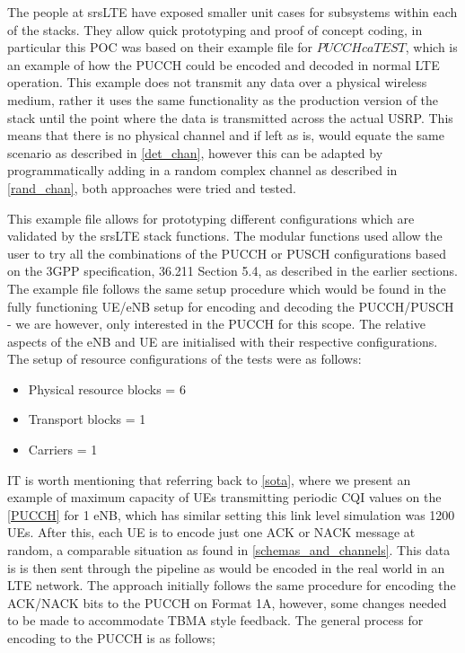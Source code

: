 \documentclass{article}
\begin{document}
The people at srsLTE have exposed smaller unit cases for subsystems within each of the stacks. They allow quick prototyping and proof of concept coding, in particular this POC was based on their example file for $PUCCH ca TEST$, which is an example of how the PUCCH could be encoded and decoded in normal LTE operation. This example does not transmit any data over a physical wireless medium, rather it uses the same functionality as the production version of the stack until the point where the data is transmitted across the actual USRP. This means that there is no physical channel and if left as is, would equate the same scenario as described in \cref{det_chan}, however this can be adapted by programmatically adding in a random complex channel as described in \cref{rand_chan}, both approaches were tried and tested. 

This example file allows for prototyping different configurations which are validated by the srsLTE stack functions. The modular functions used allow the user to try all the combinations of the PUCCH or PUSCH configurations based on the 3GPP specification, 36.211 Section 5.4, as described in the earlier sections. The example file follows the same setup procedure which would be found in the fully functioning UE/eNB setup for encoding and decoding the PUCCH/PUSCH - we are however, only interested in the PUCCH for this scope. The relative aspects of the eNB and UE are initialised with their respective configurations. The setup of resource configurations of the tests were as follows:

\begin{itemize}
    \item Physical resource blocks = 6
    \item Transport blocks = 1
    \item Carriers = 1
\end{itemize}


IT is worth mentioning that referring back to \cref{sota}, where we present an example of maximum capacity of UEs transmitting periodic CQI values on the \cref{PUCCH} for 1 \ac{eNB}, which has similar setting this link level simulation was 1200 UEs. 
After this, each UE is to encode just one ACK or NACK message at random, a comparable situation as found in \cref{schemas_and_channels}. This data is is then sent through the pipeline as would be encoded in the real world in an LTE network. The approach initially follows the same procedure for encoding the ACK/NACK bits to the PUCCH on Format 1A, however, some changes needed to be made to accommodate TBMA style feedback. The general process for encoding to the PUCCH is as follows;
\end{document}

